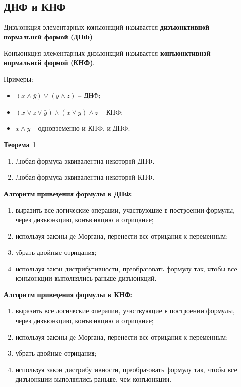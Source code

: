 \documentclass[a5paper, 11pt]{extarticle}
\theoremstyle{definition}
\newtheorem*{theorem*}{Теорема}
\theoremstyle{definition}
\theoremstyle{definition}
\numberwithin{figure}{section}
\numberwithin{table}{section}
\newcommand{\newpar}{$ $\par\nobreak\ignorespaces}
\begin{document}
\subsection{ДНФ и КНФ}

Дизъюнкция элементарных конъюнкций называется \textbf{дизъюнктивной нормальной формой (ДНФ)}.

Конъюнкция элементарных дизъюнкций называется \textbf{конъюнктивной нормальной формой (КНФ)}.

Примеры:
\begin{itemize}
    \item \((x \land \bar{y}) \lor (y \land z)\) -- ДНФ;
    \item \((x \lor z \lor \bar{y}) \land (x \lor y) \land z\) -- КНФ;
    \item \(x \land \bar{y}\) -- одновременно и КНФ, и ДНФ.
\end{itemize}

\begin{theorem*}
    \newpar
    \begin{enumerate}
        \item Любая формула эквивалентна некоторой ДНФ.
        \item Любая формула эквивалентна некоторой КНФ.
    \end{enumerate}
\end{theorem*}

\noindent \textbf{Алгоритм приведения формулы к ДНФ:}
\begin{enumerate}
    \item выразить все логические операции, участвующие в построении формулы, через дизъюнкцию, конъюнкцию и отрицание;
    \item используя законы де Моргана, перенести все отрицания к переменным;
    \item убрать двойные отрицания;
    \item используя закон дистрибутивности, преобразовать формулу так, чтобы все конъюнкции выполнялись раньше дизъюнкций.
\end{enumerate}

\noindent \textbf{Алгоритм приведения формулы к КНФ:}
\begin{enumerate}
    \item выразить все логические операции, участвующие в построении формулы, через дизъюнкцию, конъюнкцию и отрицание;
    \item используя законы де Моргана, перенести все отрицания к переменным;
    \item убрать двойные отрицания;
    \item используя закон дистрибутивности, преобразовать формулу так, чтобы все дизъюнкции выполнялись раньше, чем конъюнкции.
\end{enumerate}
\end{document}
